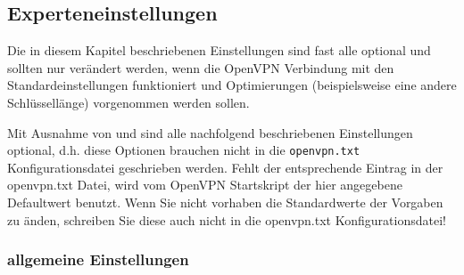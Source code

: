 \subsection{Experteneinstellungen}

Die in diesem Kapitel beschriebenen Einstellungen sind fast alle optional
und sollten nur verändert werden, wenn die OpenVPN Verbindung mit den
Standardeinstellungen funktioniert und Optimierungen (beispielsweise eine
andere Schlüssellänge) vorgenommen werden sollen.

Mit Ausnahme von  und
 sind alle nachfolgend beschriebenen
 Einstellungen optional, d.h. diese Optionen brauchen
nicht in die \texttt{openvpn.txt} Konfigurationsdatei geschrieben werden. Fehlt
der entsprechende Eintrag in der openvpn.txt Datei, wird vom OpenVPN Startskript
der hier angegebene Defaultwert benutzt. Wenn Sie nicht vorhaben die
Standardwerte der Vorgaben zu änden, schreiben Sie diese auch nicht in
die openvpn.txt Konfigurationsdatei!

\subsubsection{allgemeine Einstellungen}

